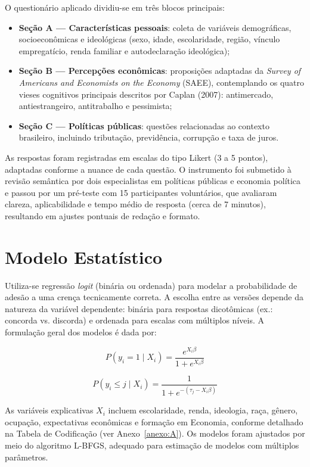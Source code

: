 O questionário aplicado dividiu-se em três blocos principais:
\begin{itemize}
    \item \textbf{Seção A — Características pessoais}: coleta de variáveis demográficas, socioeconômicas e ideológicas (sexo, idade, escolaridade, região, vínculo empregatício, renda familiar e autodeclaração ideológica);
    \item \textbf{Seção B — Percepções econômicas}: proposições adaptadas da \textit{Survey of Americans and Economists on the Economy} (SAEE), contemplando os quatro vieses cognitivos principais descritos por Caplan (2007): antimercado, antiestrangeiro, antitrabalho e pessimista;
    \item \textbf{Seção C — Políticas públicas}: questões relacionadas ao contexto brasileiro, incluindo tributação, previdência, corrupção e taxa de juros.
\end{itemize}

As respostas foram registradas em escalas do tipo Likert (3 a 5 pontos), adaptadas conforme a nuance de cada questão. O instrumento foi submetido à revisão semântica por dois especialistas em políticas públicas e economia política e passou por um pré-teste com 15 participantes voluntários, que avaliaram clareza, aplicabilidade e tempo médio de resposta (cerca de 7 minutos), resultando em ajustes pontuais de redação e formato.

\section{Modelo Estatístico}

Utiliza-se regressão \textit{logit} (binária ou ordenada) para modelar a probabilidade de adesão a uma crença tecnicamente correta. A escolha entre as versões depende da natureza da variável dependente: binária para respostas dicotômicas (ex.: concorda vs. discorda) e ordenada para escalas com múltiplos níveis. A formulação geral dos modelos é dada por:

\begin{equation}
P(y_i = 1 \mid X_i) = \frac{e^{X_i \beta}}{1 + e^{X_i \beta}}
\end{equation}

\begin{equation}
P(y_i \leq j \mid X_i) = \frac{1}{1 + e^{-(\tau_j - X_i \beta)}}
\end{equation}



As variáveis explicativas \(X_i\) incluem escolaridade, renda, ideologia, raça, gênero, ocupação, expectativas econômicas e formação em Economia, conforme detalhado na Tabela de Codificação (ver Anexo~\ref{anexo:A}). Os modelos foram ajustados por meio do algoritmo L-BFGS, adequado para estimação de modelos com múltiplos parâmetros.

